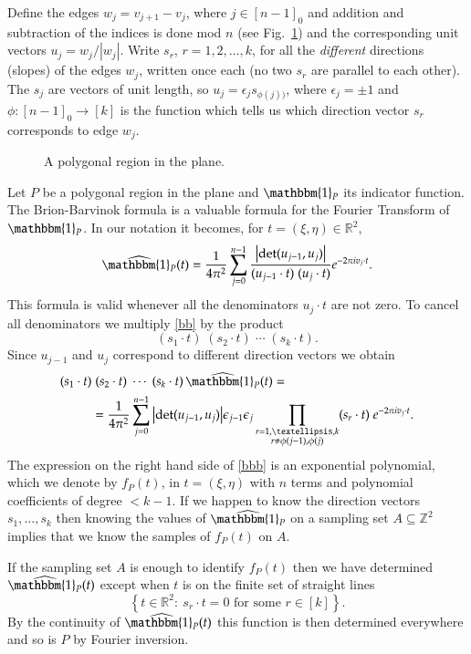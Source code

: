 \documentclass[12pt,a4paper,oneside]{amsart}
\theoremstyle{definition}
\newcommand{\Abs}[1]{{\left|{#1}\right|}}
\newcommand{\Set}[1]{{\left\{{#1}\right\}}}
\newcommand{\RR}{{\mathbb R}}
\newcommand{\ZZ}{{\mathbb Z}}
\newcommand{\one}{{\mathbbm{1}}}
\newcommand{\ft}[1]{\widehat{#1}}
\begin{document}
Define the edges $w_j = v_{j+1}-v_j$, where $j \in [n-1]_0$ and addition and subtraction of the indices is done mod $n$ (see Fig.\ \ref{fig:polygon}) and the corresponding unit vectors $u_j = w_j/\Abs{w_j}$. Write $s_r$, $r = 1, 2, \ldots, k$, for all the \textit{different} directions (slopes) of the edges $w_j$, written once each (no two $s_r$ are parallel to each other). The $s_j$ are vectors of unit length, so $u_j = \epsilon_j s_{\phi(j))}$, where $\epsilon_j = \pm 1$ and $\phi:[n-1]_0 \to [k]$ is the function which tells us which direction vector $s_r$ corresponds to edge $w_j$.

\begin{figure}[h]
 
 \caption{A polygonal region in the plane.}\label{fig:polygon}
\end{figure}

Let $P$ be a polygonal region in the plane and $\one_P$ its indicator function. The Brion-Barvinok formula \cite{robins2024fourier} is a valuable formula for the Fourier Transform of $\one_P$. In our notation it becomes, for $t=(\xi, \eta) \in \RR^2$,
\begin{equation}\label{bb}
\ft{\one_P}(t) = \frac{1}{4\pi^2} \sum_{j=0}^{n-1} \frac{\Abs{\det(u_{j-1}, u_j)}}{(u_{j-1}\cdot t) \; (u_j \cdot t)} e^{-2\pi i v_j \cdot t}.
\end{equation}
This formula is valid whenever all the denominators $u_j\cdot t$ are not zero. To cancel all denominators we multiply \eqref{bb} by the product
$$
(s_1 \cdot t) \; (s_2 \cdot t) \; \cdots \; (s_k \cdot t).
$$
Since $u_{j-1}$ and $u_j$ correspond to different direction vectors we obtain
\begin{align}\label{bbb}
(s_1 \cdot t) & \; (s_2 \cdot t) \; \cdots \; (s_k \cdot t) \,  \ft{\one_P}(t) = \\
 &= \frac{1}{4\pi^2} \sum_{j=0}^{n-1} \Abs{\det(u_{j-1}, u_j)} \epsilon_{j-1} \epsilon_j \prod_{\substack{r=1,\ldots,k \\ r \neq \phi(j-1), \phi(j)}} (s_r \cdot t) \; e^{-2\pi i v_j \cdot t}. \nonumber
\end{align}
The expression on the right hand side of \eqref{bbb} is an exponential polynomial, which we denote by $f_P(t)$, in $t=(\xi, \eta)$ with $n$ terms and polynomial coefficients of degree $< k-1$.
If we happen to know the direction vectors $s_1, \ldots, s_k$ then knowing the values of $\ft{\one_P}$ on a sampling set $A \subseteq \ZZ^2$ implies that we know the samples of $f_P(t)$ on $A$.

If the sampling set $A$ is enough to identify $f_P(t)$ then we have determined $\ft{\one_P}(t)$ except when $t$ is on the finite set of straight lines
$$
\Set{t\in\RR^2:\ s_r\cdot t= 0 \text{ for some } r \in [k]}.
$$
By the continuity of $\ft{\one_P}(t)$ this function is then determined everywhere and so is $P$ by Fourier inversion.
\end{document}
